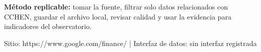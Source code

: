 \documentclass[9pt,a4paper]{extarticle}
\begin{document}
\vspace{0.06cm}
\begin{tcolorbox}[enhanced,colback=white,colframe=cchenpurple!55,boxrule=0.45pt,arc=2pt,left=6pt,right=6pt,top=5pt,bottom=5pt]
{\bfseries\color{cchenpurple}Método replicable:} tomar la fuente, filtrar solo datos relacionados con CCHEN, guardar el archivo local, revisar calidad y usar la evidencia para indicadores del observatorio.
\end{tcolorbox}

\vspace{0.02cm}
{\scriptsize\color{mutedgray}Sitio: https://www.google.com/finance/ \quad | \quad Interfaz de datos: sin interfaz registrada}
\end{document}
